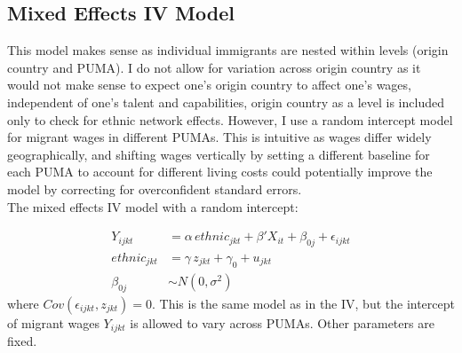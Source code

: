 \documentclass[11pt]{article}
\begin{document}
\subsection{Mixed Effects IV Model}
This model makes sense as individual immigrants are nested within levels (origin country and PUMA). I do not allow for variation across origin country as it would not make sense to expect one's origin country to affect one's wages, independent of one's talent and capabilities, origin country as a level is included only to check for ethnic network effects. However, I use a random intercept model for migrant wages in different PUMAs. This is intuitive as wages differ widely geographically, and shifting wages vertically by setting a different baseline for each PUMA to account for different living costs could potentially improve the model by correcting for overconfident standard errors. \\The mixed effects IV model with a random intercept:

\begin{align*}
    Y_{ijkt}&=\alpha \,ethnic_{jkt} + \beta'X_{it}+\beta_{0j}+\epsilon_{ijkt}\\
    ethnic_{jkt}&=\gamma \, z_{jkt} + \gamma_0 + u_{jkt}\\ 
    \beta_{0j} &\sim N(0, \sigma^2)
\end{align*}
where $Cov(\epsilon_{ijkt}, z_{jkt})=0$. This is the same model as in the IV, but the intercept of migrant wages $Y_{ijkt}$ is allowed to vary across PUMAs. Other parameters are fixed. 



  
 
\end{document}
